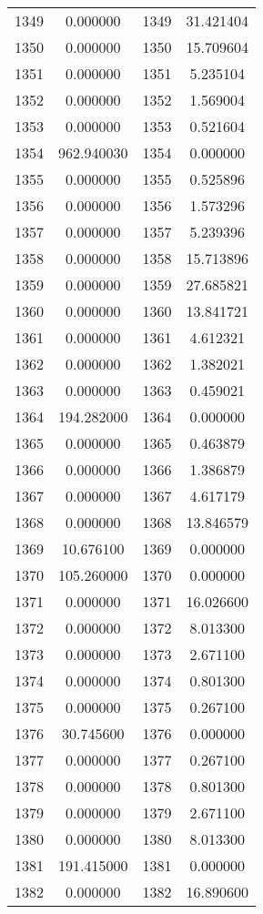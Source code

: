 \documentclass[12pt]{article}
\begin{document}
\begin{longtable}{@{}cccc@{}}
1349 & 0.000000 & 1349 & 31.421404 \\
1350 & 0.000000 & 1350 & 15.709604 \\
1351 & 0.000000 & 1351 & 5.235104 \\
1352 & 0.000000 & 1352 & 1.569004 \\
1353 & 0.000000 & 1353 & 0.521604 \\
1354 & 962.940030 & 1354 & 0.000000 \\
1355 & 0.000000 & 1355 & 0.525896 \\
1356 & 0.000000 & 1356 & 1.573296 \\
1357 & 0.000000 & 1357 & 5.239396 \\
1358 & 0.000000 & 1358 & 15.713896 \\
1359 & 0.000000 & 1359 & 27.685821 \\
1360 & 0.000000 & 1360 & 13.841721 \\
1361 & 0.000000 & 1361 & 4.612321 \\
1362 & 0.000000 & 1362 & 1.382021 \\
1363 & 0.000000 & 1363 & 0.459021 \\
1364 & 194.282000 & 1364 & 0.000000 \\
1365 & 0.000000 & 1365 & 0.463879 \\
1366 & 0.000000 & 1366 & 1.386879 \\
1367 & 0.000000 & 1367 & 4.617179 \\
1368 & 0.000000 & 1368 & 13.846579 \\
1369 & 10.676100 & 1369 & 0.000000 \\
1370 & 105.260000 & 1370 & 0.000000 \\
1371 & 0.000000 & 1371 & 16.026600 \\
1372 & 0.000000 & 1372 & 8.013300 \\
1373 & 0.000000 & 1373 & 2.671100 \\
1374 & 0.000000 & 1374 & 0.801300 \\
1375 & 0.000000 & 1375 & 0.267100 \\
1376 & 30.745600 & 1376 & 0.000000 \\
1377 & 0.000000 & 1377 & 0.267100 \\
1378 & 0.000000 & 1378 & 0.801300 \\
1379 & 0.000000 & 1379 & 2.671100 \\
1380 & 0.000000 & 1380 & 8.013300 \\
1381 & 191.415000 & 1381 & 0.000000 \\
1382 & 0.000000 & 1382 & 16.890600 \\

\end{longtable}
\end{document}
